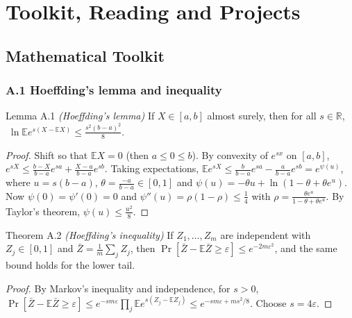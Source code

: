 \documentclass[11pt,a4paper,openany]{book}
\newcommand{\R}{\mathbb{R}}
\newcommand{\E}{\mathbb{E}}
\newcommand{\eps}{\varepsilon}
\newcommand{\thepartblurb}{}
\begin{document}
\def\thepartblurb{The probabilistic and convex-analytic facts used throughout, and where to go next.}\part{Toolkit, Reading and Projects}\label{part8}

\appendix

\chapter[Mathematical toolkit]{Mathematical Toolkit}\label{appA}

\section*{A.1 Hoeffding's lemma and inequality}\label{appA-hoeff}

\begin{bthm}{Lemma A.1 \emph{(Hoeffding's lemma)}}
If $X\in[a,b]$ almost surely, then for all $s\in\R$, $\;\ln\E e^{s(X-\E X)}\le\frac{s^2(b-a)^2}{8}$.
\end{bthm}

\begin{proof}
Shift so that $\E X=0$ (then $a\le0\le b$). By convexity of $e^{sx}$ on $[a,b]$, $e^{sX}\le\frac{b-X}{b-a}e^{sa}+\frac{X-a}{b-a}e^{sb}$. Taking expectations, $\E e^{sX}\le\frac{b}{b-a}e^{sa}-\frac{a}{b-a}e^{sb}=e^{\psi(u)}$, where $u=s(b-a)$, $\theta=\frac{-a}{b-a}\in[0,1]$ and $\psi(u)=-\theta u+\ln(1-\theta+\theta e^u)$. Now $\psi(0)=\psi'(0)=0$ and $\psi''(u)=\rho(1-\rho)\le\frac14$ with $\rho=\frac{\theta e^u}{1-\theta+\theta e^u}$. By Taylor's theorem, $\psi(u)\le\frac{u^2}{8}$.
\end{proof}

\begin{bthm}{Theorem A.2 \emph{(Hoeffding's inequality)}}
If $Z_1,\dots,Z_m$ are independent with $Z_j\in[0,1]$ and $\bar Z=\frac1m\sum_jZ_j$, then $\Pr[\bar Z-\E\bar Z\ge\eps]\le e^{-2m\eps^2}$, and the same bound holds for the lower tail.
\end{bthm}

\begin{proof}
By Markov's inequality and independence, for $s>0$, $\Pr[\bar Z-\E\bar Z\ge\eps]\le e^{-sm\eps}\prod_j\E e^{s(Z_j-\E Z_j)}\le e^{-sm\eps+ms^2/8}$. Choose $s=4\eps$.
\end{proof}
\end{document}
